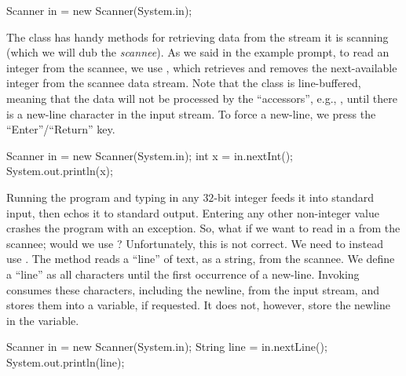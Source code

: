 \begin{verbnobox}[\footnotesize]
Scanner in = new Scanner(System.in);
\end{verbnobox}

The  class has handy methods for retrieving data from the stream it is scanning (which we will dub the \textit{scannee}). As we said in the example prompt, to read an integer from the scannee, we use , which retrieves and removes the next-available integer from the scannee data stream. Note that the  class is line-buffered, meaning that the data will not be processed by the ``accessors'', e.g., , until there is a new-line character in the input stream. To force a new-line, we press the ``Enter''/``Return'' key.

\begin{verbnobox}[\footnotesize]
Scanner in = new Scanner(System.in);
int x = in.nextInt();
System.out.println(x);
\end{verbnobox}

Running the program and typing in any $32$-bit integer feeds it into standard input, then echos it to standard output. Entering any other non-integer value crashes the program with an  exception. So, what if we want to read in a  from the scannee; would we use ? Unfortunately, this is not correct. We need to instead use . The  method reads a ``line'' of text, as a string, from the scannee. We define a ``line'' as all characters until the first occurrence of a new-line. Invoking  consumes these characters, including the newline, from the input stream, and stores them into a variable, if requested. It does not, however, store the newline in the variable. 

\begin{verbnobox}[\footnotesize]
Scanner in = new Scanner(System.in);
String line = in.nextLine();
System.out.println(line);
\end{verbnobox}

